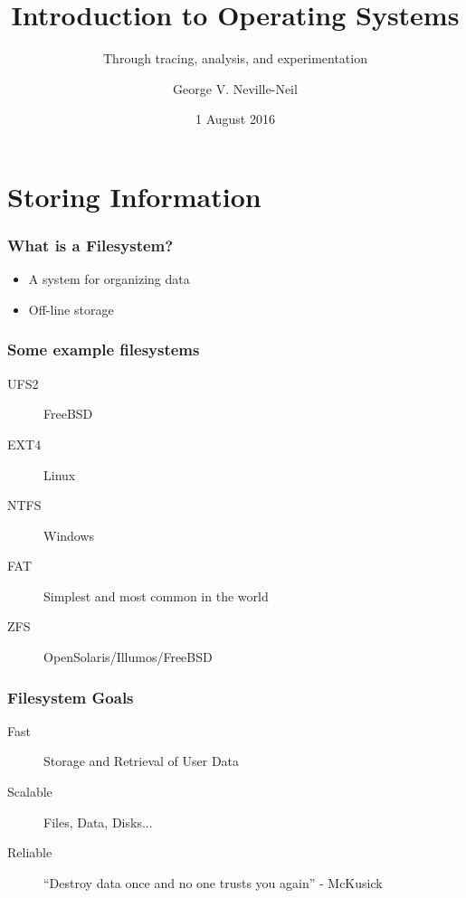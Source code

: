 \documentclass[pdftex]{beamer} %
\begin{document}

\title{Introduction to Operating Systems}
\subtitle{Through tracing, analysis, and experimentation}
\author{George V. Neville-Neil}
\date{1 August 2016}

\begin{frame}
  \titlepage
\end{frame}

\section{Storing Information}
\label{sec:storage}

\begin{frame}
  \frametitle{What is a Filesystem?}
  \begin{itemize}
  \item A system for organizing data
  \item Off-line storage
  \end{itemize}
\end{frame}

\begin{frame}
  \frametitle{Some example filesystems}
  \begin{description}
  \item[UFS2] FreeBSD
    \pause
    
  \item[EXT4] Linux
    
    \pause
    
  \item[NTFS] Windows

    \pause

  \item[FAT] Simplest and most common in the world

    \pause

  \item[ZFS] OpenSolaris/Illumos/FreeBSD
  \end{description}
\end{frame}

\begin{frame}
  \frametitle{Filesystem Goals}
  \begin{description}
  \item [Fast] Storage and Retrieval of User Data

    \pause

  \item [Scalable] Files, Data, Disks...

    \pause
    
  \item[Reliable] ``Destroy data once and no one trusts you again'' - McKusick
  \end{description}
\end{frame}
\end{document}
